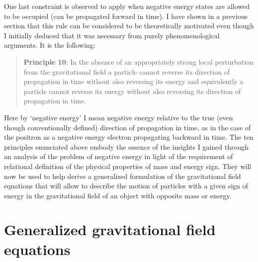 \documentclass[notitlepage,12pt]{report}
\begin{document}
One last constraint is observed to apply when negative energy states are allowed to be occupied (can be propagated forward in time). I have shown in a previous section that this rule can be considered to be theoretically motivated even though I initially deduced that it was necessary from purely phenomenological arguments. It is the following:
\begin{quote}
\textbf{Principle 10}: In the absence of an appropriately strong local perturbation from the gravitational field a particle cannot reverse its direction of propagation in time without also reversing its energy and equivalently a particle cannot reverse its energy without also reversing its direction of propagation in time.
\end{quote}
Here by `negative energy' I mean negative energy relative to the true (even though conventionally defined) direction of propagation in time, as in the case of the positron as a negative energy electron propagating backward in time. The ten principles enunciated above embody the essence of the insights I gained through an analysis of the problem of negative energy in light of the requirement of relational definition of the physical properties of mass and energy sign. They will now be used to help derive a generalized formulation of the gravitational field equations that will allow to describe the motion of particles with a given sign of energy in the gravitational field of an object with opposite mass or energy.

\section{Generalized gravitational field equations}
\end{document}
